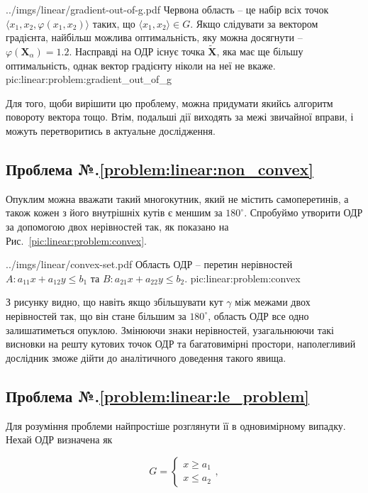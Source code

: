 \documentclass[\main/book.tex]{subfiles}
\begin{document}
\illustration
 {../imgs/linear/gradient-out-of-g.pdf}
 {Червона область -- це набір всіх точок $\langle x_1, x_2, \varphi(x_1, x_2)\rangle$ таких, що $\langle x_1, x_2 \rangle \in G$. Якщо слідувати за вектором градієнта, найбільш можлива оптимальність, яку можна досягнути -- $\varphi(\mathbf{X}_\alpha)=1.2$. Насправді на ОДР існує точка $\widetilde{\mathbf{X}}$, яка має ще більшу оптимальність, однак вектор градієнту ніколи на неї не вкаже.}
 {pic:linear:problem:gradient_out_of_g}

Для того, щоби вирішити цю проблему, можна придумати якийсь алгоритм повороту вектора тощо. Втім, подальші дії виходять за межі звичайної вправи, і можуть перетворитись в актуальне дослідження.

\subsection*{Проблема №.\ref{problem:linear:non_convex}}

Опуклим можна вважати такий многокутник, який не містить самоперетинів, а також кожен з його внутрішніх кутів є меншим за $180^\circ$. Спробуймо утворити ОДР за допомогою двох нерівностей так, як показано на Рис.~\ref{pic:linear:problem:convex}.

\illustration
 {../imgs/linear/convex-set.pdf}
 {Область ОДР -- перетин нерівностей ${A: a_{11} x + a_{12} y \leq b_1}$ та ${B: a_{21} x + a_{22} y \leq b_2}$.}
 {pic:linear:problem:convex}

З рисунку видно, що навіть якщо збільшувати кут $\gamma$ між межами двох нерівностей так, що він стане більшим за $180^\circ$, область ОДР все одно залишатиметься опуклою. Змінюючи знаки нерівностей, узагальнюючи такі висновки на решту кутових точок ОДР та багатовимірні простори, наполегливий дослідник зможе дійти до аналітичного доведення такого явища.

\subsection*{Проблема №.\ref{problem:linear:le_problem}}

Для розуміння проблеми найпростіше розглянути її в одновимірному випадку. Нехай ОДР визначена як

\[
 G = \left\{
  \begin{array}{l}
   x \geq a_1 \\
   x \leq a_2
  \end{array}
 \right.,
\]
\end{document}
